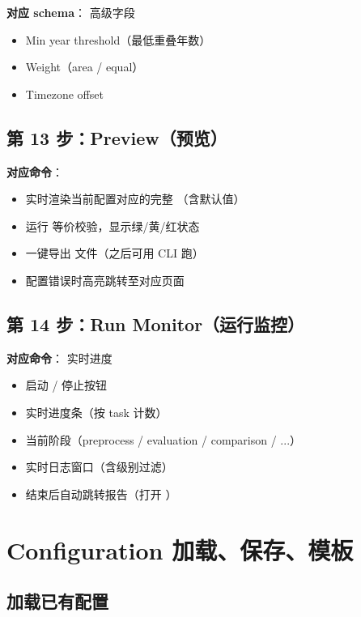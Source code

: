 \textbf{对应 schema}： 高级字段

\begin{itemize}
  \item Min year threshold（最低重叠年数）
  \item Weight（area / equal）
  \item Timezone offset
\end{itemize}

\subsection{第 13 步：Preview（预览）}

\textbf{对应命令}：

\begin{itemize}
  \item 实时渲染当前配置对应的完整 （含默认值）
  \item 运行  等价校验，显示绿/黄/红状态
  \item 一键导出  文件（之后可用 CLI 跑）
  \item 配置错误时高亮跳转至对应页面
\end{itemize}

\subsection{第 14 步：Run Monitor（运行监控）}

\textbf{对应命令}： 实时进度

\begin{itemize}
  \item 启动 / 停止按钮
  \item 实时进度条（按 task 计数）
  \item 当前阶段（preprocess / evaluation / comparison / ...）
  \item 实时日志窗口（含级别过滤）
  \item 结束后自动跳转报告（打开 ）
\end{itemize}

\section{Configuration 加载、保存、模板}

\subsection{加载已有配置}

